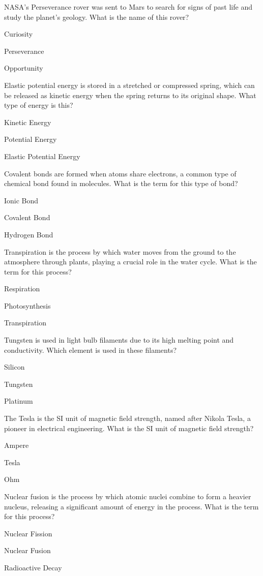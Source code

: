 \begin{enhancedmcq}{NASA's Perseverance rover was sent to Mars to search for signs of past life and study the planet's geology. What is the name of this rover?}
\item Curiosity
\item Perseverance
\item Opportunity

\end{enhancedmcq}
\begin{enhancedmcq}{Elastic potential energy is stored in a stretched or compressed spring, which can be released as kinetic energy when the spring returns to its original shape. What type of energy is this?}
\item Kinetic Energy
\item Potential Energy
\item Elastic Potential Energy

\end{enhancedmcq}
\begin{enhancedmcq}{Covalent bonds are formed when atoms share electrons, a common type of chemical bond found in molecules. What is the term for this type of bond?}
\item Ionic Bond
\item Covalent Bond
\item Hydrogen Bond

\end{enhancedmcq}
\begin{enhancedmcq}{Transpiration is the process by which water moves from the ground to the atmosphere through plants, playing a crucial role in the water cycle. What is the term for this process?}
\item Respiration
\item Photosynthesis
\item Transpiration

\end{enhancedmcq}
\begin{enhancedmcq}{Tungsten is used in light bulb filaments due to its high melting point and conductivity. Which element is used in these filaments?}
\item Silicon
\item Tungsten
\item Platinum

\end{enhancedmcq}
\begin{enhancedmcq}{The Tesla is the SI unit of magnetic field strength, named after Nikola Tesla, a pioneer in electrical engineering. What is the SI unit of magnetic field strength?}
\item Ampere
\item Tesla
\item Ohm

\end{enhancedmcq}
\begin{enhancedmcq}{Nuclear fusion is the process by which atomic nuclei combine to form a heavier nucleus, releasing a significant amount of energy in the process. What is the term for this process?}
\item Nuclear Fission
\item Nuclear Fusion
\item Radioactive Decay
\end{enhancedmcq}